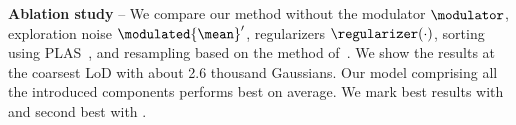 \begin{table}[!t]
\begin{minipage}[t]{0.49\linewidth}
{    }
    \caption[Ablation study evaluating components introduced in \clog]{\textbf{Ablation study} --
      We compare our method without
      the modulator $\modulator$,
      exploration noise $\modulated{\mean}'$,
      regularizers $\regularizer(\cdot)$,
      sorting using PLAS~\cite{morgenstern2024compact},
      and resampling based on the method of~\citet{bulo2024revising}.
      We show the results at the coarsest LoD with about 2.6 thousand Gaussians.
      Our model comprising all the introduced components performs best on average.
      We mark best results with  and second best with
      .
    }
    \label{tab:clog-ablation}
  \end{minipage}
\end{table}